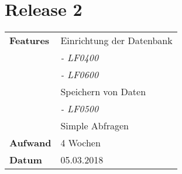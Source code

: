 
\section*{Release 2}
\label{sec:release_2}

\begin{tabular}{p{5cm} p{9cm}}
    \textbf{Features} & Einrichtung der Datenbank \\
    & \hspace{8pt} \textit{\footnotesize - LF0400} \\
    & \hspace{8pt} \textit{\footnotesize - LF0600} \\
    & Speichern von Daten \\
    & \hspace{8pt} \textit{\footnotesize - LF0500} \\
    & Simple Abfragen  \\
    \hline
    \textbf{Aufwand} & 4 Wochen\\
    \hline
    \textbf{Datum} & 05.03.2018
\end{tabular}
